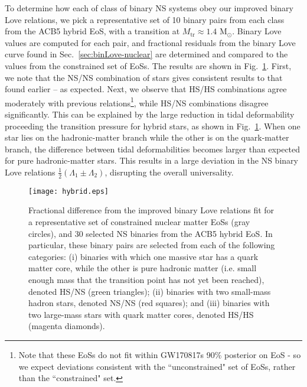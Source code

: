 \documentclass[prd,twocolumn,nofootinbib,superscriptaddress,amsmath,amssymb]{revtex4-1}
\begin{document}
To determine how each of class of binary NS systems obey our improved binary Love relations, we pick a representative set of 10 binary pairs from each class from the ACB5 hybrid EoS, with a transition at $M_{\text{tr}} \approx 1.4 \text{ M}_{\odot}$.
Binary Love values are computed for each pair, and fractional residuals from the binary Love curve found in Sec.~\ref{sec:binLove-nuclear} are determined and compared to the values from the constrained set of EoSs.
The results are shown in Fig.~\ref{fig:hybrid}.
First, we note that the NS/NS combination of stars gives consistent results to that found earlier -- as expected.
Next, we observe that HS/HS combinations agree moderately with previous relations\footnote{Note that these EoSs do not fit within GW170817s 90\% posterior on EoS - so we expect deviations consistent with the ``unconstrained" set of EoSs, rather than the ``constrained" set.}, while HS/NS combinations disagree significantly.
This can be explained by the large reduction in tidal deformability proceeding the transition pressure for hybrid stars, as shown in Fig.~\ref{fig:hybrid}.
When one star lies on the hadronic-matter branch while the other is on the quark-matter branch, 
the difference between tidal deformabilities becomes larger than expected for pure hadronic-matter stars.
This results in a large deviation in the NS binary Love relations $\frac{1}{2}(\Lambda_1 \pm \Lambda_2)$, disrupting the overall universality.
{}
{}

\begin{figure}
\begin{center} 
\texttt{[image: hybrid.eps]}
\end{center}
\caption{
Fractional difference from the improved binary Love relations fit for a representative set of constrained nuclear matter EoSs (gray circles), and 30 selected NS binaries from the ACB5 hybrid EoS.
In particular, these binary pairs are selected from each of the following categories: (i) binaries with which one massive star has a quark matter core, while the other is pure hadronic matter (i.e. small enough mass that the transition point has not yet been reached), denoted HS/NS (green triangles); (ii) binaries with two small-mass hadron stars, denoted NS/NS (red squares); and (iii) binaries with two large-mass stars with quark matter cores, denoted HS/HS (magenta diamonds).
}
\label{fig:hybrid}
\end{figure} 
\end{document}
